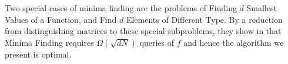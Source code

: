 \begin{note}\label{note:lb}
Two special cases of minima finding are the problems of Finding $d$ Smallest Values of a Function, and Find $d$ Elements of Different Type. By a reduction from distinguishing matrices to these special subproblems, they show in \cite{durr2004quantum} that Minima Finding requires $\Omega(\sqrt{dN})$ queries of $f$ and hence the algorithm we present is optimal. 
\end{note}